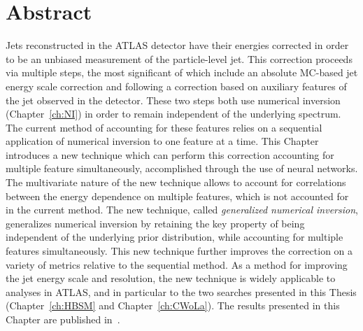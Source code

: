 \section{Abstract}
Jets reconstructed in the ATLAS detector have their energies corrected in order to be an unbiased measurement of the particle-level jet.
This correction proceeds via multiple steps, the most significant of which include an absolute MC-based jet energy scale correction and following a correction based on auxiliary features of the jet observed in the detector.
These two steps both use numerical inversion (Chapter~\ref{ch:NI}) in order to remain independent of the underlying spectrum.
The current method of accounting for these features relies on a sequential application of numerical inversion to one feature at a time.
This Chapter introduces a new technique which can perform this correction accounting for multiple feature simultaneously, accomplished through the use of neural networks.
The multivariate nature of the new technique allows to account for correlations between the energy dependence on multiple features, which is not accounted for in the current method.
The new technique, called \textit{generalized numerical inversion}, generalizes numerical inversion by retaining the key property of being independent of the underlying prior distribution, while accounting for multiple features simultaneously.
This new technique further improves the correction on a variety of metrics relative to the sequential method.
As a method for improving the jet energy scale and resolution, the new technique is widely applicable to analyses in ATLAS, and in particular to the two searches presented in this Thesis (Chapter~\ref{ch:HBSM} and Chapter~\ref{ch:CWoLa}).
The results presented in this Chapter are published in~\cite{ATL-PHYS-PUB-2018-013}.

